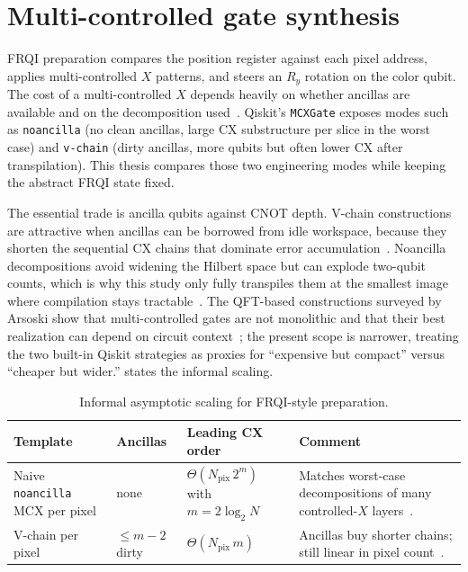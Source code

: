 \section{Multi-controlled gate synthesis}
FRQI preparation compares the position register against each pixel address, applies multi-controlled $X$ patterns, and steers an $R_y$ rotation on the color qubit. The cost of a multi-controlled $X$ depends heavily on whether ancillas are available and on the decomposition used~\cite{Vale2023MCSU2,Azevedo2024LowDepthMCG,Arsoski2024MCXQFT,Zindorf2024EfficientMCG}. Qiskit's \texttt{MCXGate} exposes modes such as \texttt{noancilla} (no clean ancillas, large CX substructure per slice in the worst case) and \texttt{v-chain} (dirty ancillas, more qubits but often lower CX after transpilation). This thesis compares those two engineering modes while keeping the abstract FRQI state fixed.

The essential trade is ancilla qubits against CNOT depth. V-chain constructions are attractive when ancillas can be borrowed from idle workspace, because they shorten the sequential CX chains that dominate error accumulation~\cite{Azevedo2024LowDepthMCG}. Noancilla decompositions avoid widening the Hilbert space but can explode two-qubit counts, which is why this study only fully transpiles them at the smallest image where compilation stays tractable~\cite{Zindorf2024EfficientMCG}. The QFT-based constructions surveyed by Arsoski show that multi-controlled gates are not monolithic and that their best realization can depend on circuit context~\cite{Arsoski2024MCXQFT}; the present scope is narrower, treating the two built-in Qiskit strategies as proxies for ``expensive but compact'' versus ``cheaper but wider.''  states the informal scaling.

\begin{table}[htbp]
\centering
\caption{Informal asymptotic scaling for FRQI-style preparation.}
\label{tab:mcx-scaling}
\small
\begin{tabular}{p{3.6cm}p{2.4cm}p{2.4cm}p{4.6cm}}
\toprule
Template & Ancillas & Leading CX order & Comment \\
\midrule
Naive \texttt{noancilla} MCX per pixel & none & $\Theta(N_{\mathrm{pix}}\,2^{m})$ with $m{=}2\log_2 N$ & Matches worst-case decompositions of many controlled-$X$ layers~\cite{Zindorf2024EfficientMCG}. \\
V-chain per pixel & $\le m{-}2$ dirty & $\Theta(N_{\mathrm{pix}}\,m)$ & Ancillas buy shorter chains; still linear in pixel count~\cite{Vale2023MCSU2,Azevedo2024LowDepthMCG}. \\
\bottomrule
\end{tabular}
\end{table}

